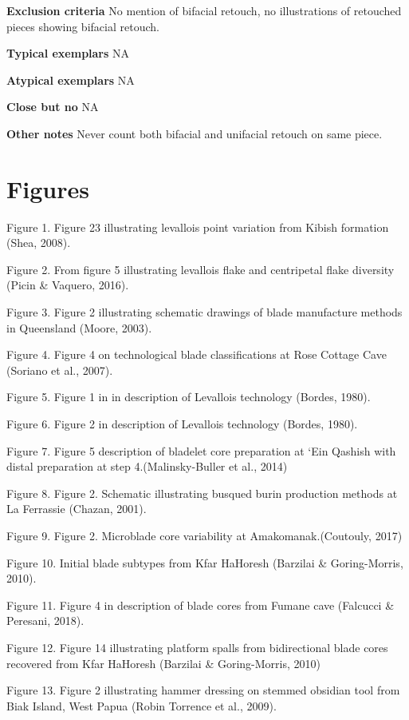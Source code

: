 \documentclass[
]{article}
\begin{document}
\textbf{Exclusion criteria} No mention of bifacial retouch, no
illustrations of retouched pieces showing bifacial retouch.

\textbf{Typical exemplars} NA

\textbf{Atypical exemplars} NA

\textbf{Close but no} NA

\textbf{Other notes} Never count both bifacial and unifacial retouch on
same piece.

\hypertarget{figures}{%
\section{Figures}\label{figures}}

Figure 1. Figure 23 illustrating levallois point variation from Kibish
formation (Shea, 2008).

Figure 2. From figure 5 illustrating levallois flake and centripetal
flake diversity (Picin \& Vaquero, 2016).

Figure 3. Figure 2 illustrating schematic drawings of blade manufacture
methods in Queensland (Moore, 2003).

Figure 4. Figure 4 on technological blade classifications at Rose
Cottage Cave (Soriano et al., 2007).

Figure 5. Figure 1 in in description of Levallois technology (Bordes,
1980).

Figure 6. Figure 2 in description of Levallois technology (Bordes,
1980).

Figure 7. Figure 5 description of bladelet core preparation at `Ein
Qashish with distal preparation at step 4.(Malinsky-Buller et al., 2014)

Figure 8. Figure 2. Schematic illustrating busqued burin production
methods at La Ferrassie (Chazan, 2001).

Figure 9. Figure 2. Microblade core variability at Amakomanak.(Coutouly,
2017)

Figure 10. Initial blade subtypes from Kfar HaHoresh (Barzilai \&
Goring-Morris, 2010).

Figure 11. Figure 4 in description of blade cores from Fumane cave
(Falcucci \& Peresani, 2018).

Figure 12. Figure 14 illustrating platform spalls from bidirectional
blade cores recovered from Kfar HaHoresh (Barzilai \& Goring-Morris,
2010)

Figure 13. Figure 2 illustrating hammer dressing on stemmed obsidian
tool from Biak Island, West Papua (Robin Torrence et al., 2009).
\end{document}
